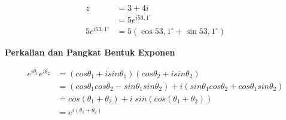 \documentclass{article}
\begin{document}
\begin{align}
    z                   & = 3 + 4i
    \nonumber                                                        \\
                        & = 5e^{i 53,1^{\circ}}
    \nonumber                                                        \\
    5e^{i 53,1^{\circ}} & = 5(\cos 53,1^{\circ} + \sin 53,1^{\circ})
    \nonumber
\end{align}



\newpage
\begin{center}
    \textbf{Perkalian dan Pangkat Bentuk Exponen}
\end{center}
\begin{align}
    e^{i\theta_1} e^{i\theta_2} & = (cos\theta_1 + i sin\theta_1)(cos\theta_2 + i sin\theta_2)
    \nonumber                                                                                                                                \\
                                & =(cos\theta_1 cos\theta_2 - sin\theta_1 sin\theta_2) + i(sin\theta_1cos\theta_2 + cos\theta_1 sin\theta_2)
    \nonumber                                                                                                                                \\
                                & = cos(\theta_1 + \theta_2) + i\;sin(cos(\theta_1 + \theta_2))
    \nonumber                                                                                                                                \\
                                & = e^{i(\theta_1 + \theta_2)}
    \nonumber
\end{align}
\end{document}
